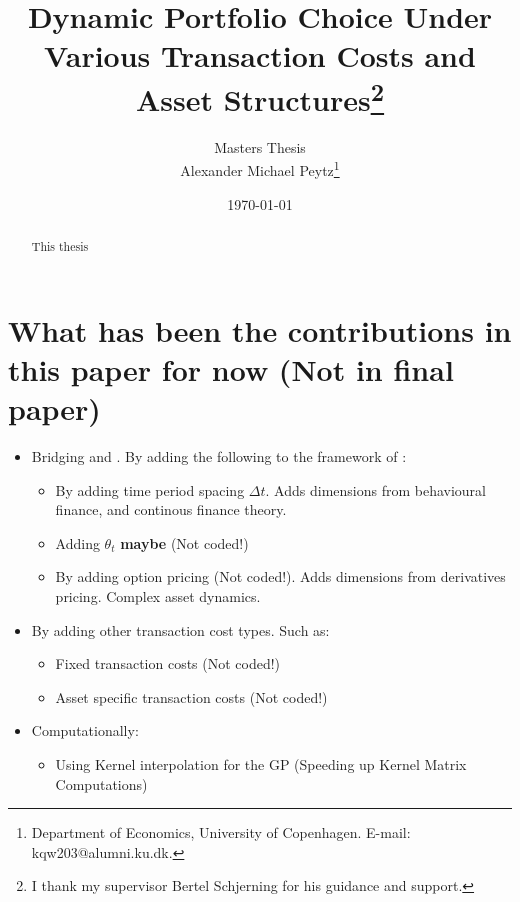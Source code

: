 \documentclass[11pt]{article}
\author{Masters Thesis\\
	Alexander Michael Peytz\footnote{Department of Economics, University of Copenhagen. E-mail: kqw203@alumni.ku.dk.}}
\title{Dynamic Portfolio Choice Under Various Transaction Costs and Asset Structures\footnote{I thank my supervisor Bertel Schjerning for his guidance and support.}}
\date{\today}
\begin{document}
% 


\clearpage
\setcounter{page}{1}

\maketitle
\renewcommand*{\thefootnote}{\fnsymbol{footnote}}

\begin{abstract}
\noindent This thesis 
\end{abstract}

\newpage
\begingroup 
  \hypersetup{linkcolor=black}
  \tableofcontents
  \newpage
  \listoffigures
  \listoftables
  \printacronyms[sort=true, template=tabular, display=used]  
\endgroup
\newpage

\clearpage
{}
\renewcommand*{\thefootnote}{\arabic{footnote}}
\setcounter{footnote}{0}
\section{What has been the contributions in this paper for now (Not in final paper)}\label{sec:contributions}
\begin{itemize}
  \item Bridging \textcite{CaiJuddXu2020} and \textcite{Scheidegger2023}. By adding the following to the framework of \textcite{Scheidegger2023}:
    \begin{itemize}
      \item By adding time period spacing $\Delta t$. Adds dimensions from behavioural finance, and continous finance theory.
      \item Adding $\theta_t$ \textbf{maybe} (Not coded!)
      \item By adding option pricing (Not coded!). Adds dimensions from derivatives pricing. Complex asset dynamics.
    \end{itemize} 
    \item By adding other transaction cost types. Such as:
    \begin{itemize}
      \item Fixed transaction costs (Not coded!)
      \item Asset specific transaction costs (Not coded!)
    \end{itemize}
    \item Computationally:
    \begin{itemize}
      \item Using Kernel interpolation for the GP (Speeding up Kernel Matrix Computations)
    \end{itemize}
\end{itemize}
\end{document}
